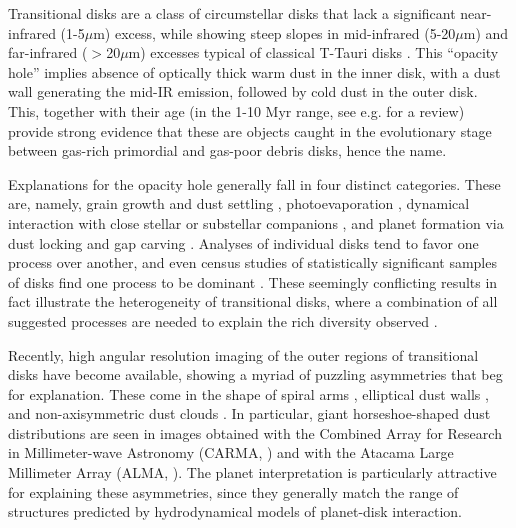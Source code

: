 \documentclass[apj]{emulateapj}
\begin{document}
Transitional disks are a class of circumstellar disks that lack a
significant near-infrared (1-5$\mu$m) excess, while showing steep
slopes in mid-infrared (5-20$\mu$m) and
far-infrared ($>$20$\mu$m) excesses typical of classical T-Tauri disks
\citep{Strom89,Skrutskie90,Gauvin-Strom92,Wolk-Walter96,Calvet02,Calvet05,Muzerolle06,Sicilia06,Currie09,Currie-Sicilia11}. 
This ``opacity hole''  implies absence of optically thick warm dust in the inner disk, with a dust
wall generating the mid-IR emission, followed by cold dust in the
outer disk.  This, together with their age (in the 1-10 Myr range, see
e.g. \citealt{Currie10} for a review) provide strong evidence that these are
objects caught in the evolutionary stage between gas-rich 
primordial and gas-poor debris disks, hence the name. 

Explanations for the opacity hole generally fall in four distinct
categories. These are, namely, grain growth and dust settling \citep{Brauer07,Dominik-Dullemond08,Zsom11,Birnstiel12}, photoevaporation
\citep{Alexander06,Cieza08,Pascucci-Sterzik09,Owen10}, 
dynamical interaction with close stellar or substellar companions
\citep{Ireland-Kraus08}, and planet
formation via dust locking \citep{Safronov69,Lyttleton72,Goldreich-Ward73,Youdin-Shu02,Johansen07} and gap
carving \citep{Papaloizou-Lin84,Lin-Papaloizou86a,Lin-Papaloizou86b,Bryden99,Paardekooper-Mellema04,Quillen04,Najita07,Andrews11}. 
Analyses of individual disks \citep{Calvet04,Calvet05,Espaillat08} tend to favor one process over another, and even census
studies of statistically significant samples of disks find one process
to be dominant \citep{Najita07,Cieza08}. These
seemingly conflicting results in fact illustrate the
heterogeneity of transitional disks, where a combination of all
suggested processes are needed to explain the rich diversity observed 
\citep{Cieza10,Muzerolle10,Merin10,Rosotti13,Clarke-Owen13}.   

Recently, high angular resolution imaging of the outer regions of transitional 
disks have become available, showing a myriad of puzzling asymmetries 
that beg for explanation. These come in the shape of spiral arms
\citep{Pietu05,Corder05,Muto12,Tang12},  elliptical dust walls
\citep{Isella12}, and non-axisymmetric dust clouds
\citep{Oppenheimer08,Brown09,Casassus12}. In particular, giant horseshoe-shaped dust distributions are seen in images obtained with 
the Combined Array for Research in Millimeter-wave Astronomy 
(CARMA, \citealt{Isella13}) and with the Atacama Large Millimeter Array (ALMA, \citealt{Casassus13,vanderMarel13}). The planet interpretation is particularly attractive for 
explaining these asymmetries, since they generally match the range of structures predicted by hydrodynamical 
models of planet-disk interaction. 
\end{document}
